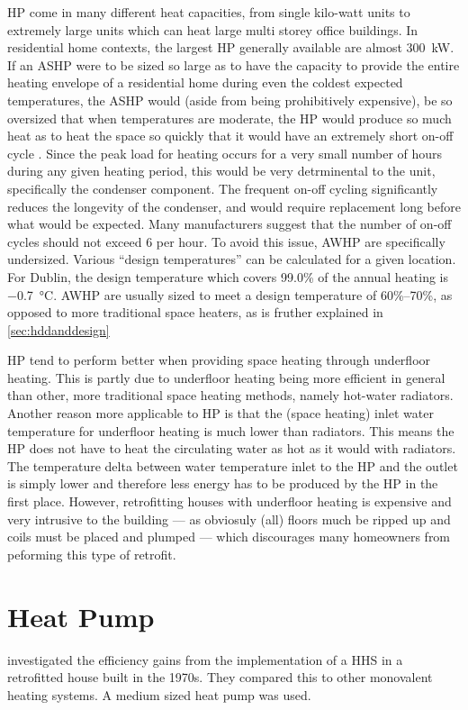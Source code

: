 \acs{HP} come in many different heat capacities, from single kilo-watt units to extremely large units which can heat large multi storey office buildings. In residential home contexts, the largest \acs{HP} generally available are almost \SI{300}{\kilo\watt}. If an \ac{ASHP} were to be sized so large as to have the capacity to provide the entire heating envelope of a residential home during even the coldest expected temperatures, the \ac{ASHP} would (aside from being prohibitively expensive), be so oversized that when temperatures are moderate, the \ac{HP} would produce so much heat as to heat the space so quickly that it would have an extremely short on-off cycle \cite{bee_air-source_2019}. Since the peak load for heating occurs for a very small number of hours during any given heating period, this would be very detrminental to the unit, specifically the condenser component. The frequent on-off cycling significantly reduces the longevity of the condenser, and would require replacement long before what would be expected. Many manufacturers suggest that the number of on-off cycles should not exceed 6 per hour. %
To avoid this issue, \acs{AWHP} are specifically undersized. Various ``design temperatures'' can be calculated for a given location. For Dublin, the design temperature which covers 99.0\% of the annual heating is \SI{-0.7}{\celsius}. \acs{AWHP} are usually sized to meet a design temperature of 60\%--70\%, as opposed to more traditional space heaters, as is fruther explained in \cref{sec:hddanddesign}%

\acs{HP} tend to perform better when providing space heating through underfloor heating. This is partly due to underfloor heating being more efficient in general than other, more traditional space heating methods, namely hot-water radiators. Another reason more applicable to \acs{HP} is that the (space heating) inlet water temperature for underfloor heating is much lower than radiators. This means the \ac{HP} does not have to heat the circulating water as hot as it would with radiators. The temperature delta between water temperature inlet to the \ac{HP} and the outlet is simply lower and therefore less energy has to be produced by the \ac{HP} in the first place. However, retrofitting houses with underfloor heating is expensive and very intrusive to the building --- as obviosuly (all) floors much be ripped up and coils must be placed and plumped --- which discourages many homeowners from peforming this type of retrofit.

\section{Heat Pump}
\cite{klein_numerical_2014} investigated the efficiency gains from the implementation of a \ac{HHS} in a retrofitted house built in the 1970s. They compared this to other monovalent heating systems. A medium sized heat pump was used. 




